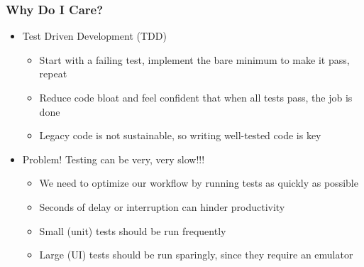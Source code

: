 \documentclass[10pt]{beamer}
\begin{document}
\begin{frame}
\frametitle{Why Do I Care?}
\begin{itemize}
    \item Test Driven Development (TDD)
    \begin{itemize}
        \item Start with a failing test, implement the bare minimum to make it pass, repeat
        \item Reduce code bloat and feel confident that when all tests pass, the job is done
        \item Legacy code is not sustainable, so writing well-tested code is key
    \end{itemize}
    \item Problem!
     Testing can be very, very slow!!!
     \begin{itemize}
        \item We need to optimize our workflow by running tests as quickly as possible
        \item Seconds of delay or interruption can hinder productivity
        \item Small (unit) tests should be run frequently
        \item Large (UI) tests should be run sparingly, since they require an emulator
     \end{itemize}
\end{itemize}
\end{frame}
\end{document}

